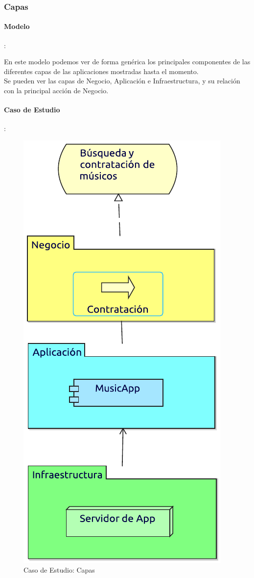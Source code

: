 \newpage

\subsubsection{Capas}
\paragraph{Modelo}:


En este modelo podemos ver de forma genérica los principales componentes de las diferentes capas de las aplicaciones mostradas hasta el momento. \\

Se pueden ver las capas de Negocio, Aplicación e Infraestructura, y su relación con la principal acción de Negocio.
\paragraph{Caso de Estudio}:

\begin{figure}[hbt!]
	\centering
	\includegraphics[width=0.4\linewidth]{Desarrollo/ArquitecturaEmpresarial/Tecnologia/imgs/capas.pdf}
	\caption{Caso de Estudio: Capas}
\end{figure}
